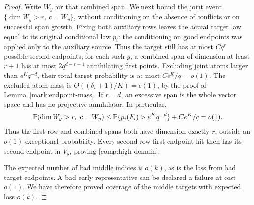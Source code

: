 \begin{proof}
Write \(W_y\) for that combined span. We next bound the joint
event \(\{\dim W_y>r,\ c\perp W_y\}\), without conditioning on
the absence of conflicts or on successful span growth.
Fixing both auxiliary rows leaves the actual target law equal to
its original conditional law \(p_i\): the conditioning on good
endpoints was applied only to the auxiliary source.
Thus the target still has at most
\(Cq^r\) possible second endpoints; for each such \(y\), a
combined span of dimension at least \(r+1\) has at most
\(2q^{d-r-1}\) annihilating first points. Excluding joint atoms
larger than \(e^Kq^{-d}\), their total target probability is
at most \(Ce^K/q=o(1)\). The excluded atom mass is
\(O((\delta_i+1)/K)=o(1)\), by the proof of
Lemma~\ref{mark:endpoint-mass}. If \(r=d\), an excessive span is
the whole vector space and has no projective annihilator.
In particular,
\[
 \mathbb P(\dim W_y>r,\ c\perp W_y)
 \le \mathbb P\{p_i(F_i)>e^Kq^{-d}\}+Ce^K/q=o(1).
\]
Thus the first-row and combined spans both have dimension exactly
\(r\), outside an \(o(1)\) exceptional probability. Every
second-row first-endpoint hit then has its second endpoint in
\(V_y\), proving \eqref{comp:high-domain}.

The expected number of bad middle indices is \(o(k)\), as is the
loss from bad target endpoints. A bad early representative can be
declared a failure at cost \(o(1)\). We have therefore proved
coverage of the middle targets with expected loss \(o(k)\).


\end{proof}
